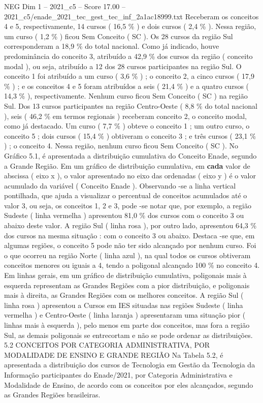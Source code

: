 \begin{textsample}{NEG Dim 1 – 2021\_c5 – Score 17.00 – 2021\_c5/enade\_2021\_tec\_gest\_tec\_inf\_2a1ac18999.txt}
Receberam os conceitos 4 e 5, respectivamente, 14 cursos ( 16,5 \% ) e dois cursos ( 2,4 \% ).
Nessa região, um curso ( 1,2 \% ) ficou Sem Conceito ( SC ).
Os 28 cursos da região Sul corresponderam a 18,9 \% do total nacional.
Como já indicado, houve predominância do conceito 3, atribuído a 42,9 \% dos cursos da região ( conceito modal ), ou seja, atribuído a 12 dos 28 cursos participantes na região Sul.
O conceito 1 foi atribuído a um curso ( 3,6 \% ) ; o conceito 2, a cinco cursos ( 17,9 \% ) ; e os conceitos 4 e 5 foram atribuídos a seis ( 21,4 \% ) e a quatro cursos ( 14,3 \% ), respectivamente.
Nenhum curso ficou Sem Conceito ( SC ) na região Sul.
Dos 13 cursos participantes na região Centro-Oeste ( 8,8 \% do total nacional ), seis ( 46,2 \% em termos regionais ) receberam conceito 2, o conceito modal, como já destacado.
Um curso ( 7,7 \% ) obteve o conceito 1 ; um outro curso, o conceito 5 ; dois cursos ( 15,4 \% ) obtiveram o conceito 3 ; e três cursos ( 23,1 \% ) ; o conceito 4.
Nessa região, nenhum curso ficou Sem Conceito ( SC ).
No Gráfico 5.1, é apresentada a distribuição cumulativa do Conceito Enade, segundo a Grande Região.
Em um gráfico de distribuição cumulativa, em \textbf{cada} valor de abscissa ( eixo x ), o valor apresentado no eixo das ordenadas ( eixo y ) é o valor acumulado da variável ( Conceito Enade ).
Observando -se a linha vertical pontilhada, que ajuda a visualizar o percentual de conceitos acumulados até o valor 3, ou seja, os conceitos 1, 2 e 3, pode -se notar que, por exemplo, a região Sudeste ( linha vermelha ) apresentou 81,0 \% dos cursos com o conceito 3 ou abaixo deste valor.
A região Sul ( linha rosa ), por outro lado, apresentou 64,3 \% dos cursos na mesma situação : com o conceito 3 ou abaixo.
Destaca -se que, em algumas regiões, o conceito 5 pode não ter sido alcançado por nenhum curso.
Foi o que ocorreu na região Norte ( linha azul ), na qual todos os cursos obtiveram conceitos menores ou iguais a 4, tendo a poligonal alcançado 100 \% no conceito 4.
Em linhas gerais, em um gráfico de distribuição cumulativa, poligonais mais à esquerda representam as Grandes Regiões com a pior distribuição, e poligonais mais à direita, as Grandes Regiões com os melhores conceitos.
A região Sul ( linha rosa ) apresentou a Cursos em IES situadas nas regiões Sudeste ( linha vermelha ) e Centro-Oeste ( linha laranja ) apresentaram uma situação pior ( linhas mais à esquerda ), pelo menos em parte dos conceitos, mas fora a região Sul, as demais poligonais se entrecortam e não se pode ordenar as distribuições. 5.2 CONCEITOS POR CATEGORIA ADMINISTRATIVA, POR MODALIDADE DE ENSINO E GRANDE REGIÃO Na Tabela 5.2, é apresentada a distribuição dos cursos de Tecnologia em Gestão da Tecnologia da Informação participantes do Enade/2021, por Categoria Administrativa e Modalidade de Ensino, de acordo com os conceitos por eles alcançados, segundo as Grandes Regiões brasileiras.

\end{textsample}
